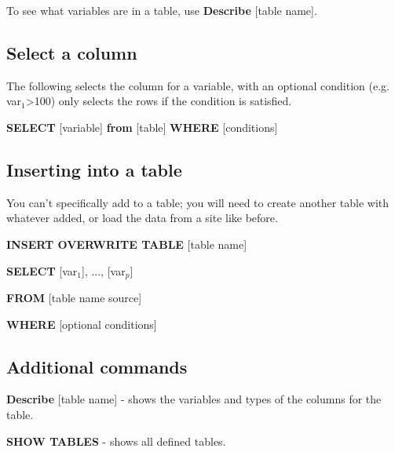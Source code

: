 \documentclass{article}
\begin{document}
To see what variables are in a table, use \textbf{Describe }[table name].

\subsection{Select a column}

The following selects the column for a variable, with an optional condition (e.g. var$_1$>100) only selects the rows if the condition is satisfied.

\textbf{SELECT }[variable] \textbf{from }[table] \textbf{WHERE }[conditions]

\subsection{Inserting into a table}

You can't specifically add to a table; you will need to create another table with whatever added, or load the data from a site like before.

\textbf{INSERT OVERWRITE TABLE }[table name]

\textbf{SELECT} [var$_1$], ..., [var$_p$]

\textbf{FROM} [table name source]

\textbf{WHERE} [optional conditions]

\subsection{Additional commands}

\textbf{Describe} [table name] - shows the variables and types of the columns for the table.

\textbf{SHOW TABLES} - shows all defined tables.
\end{document}
